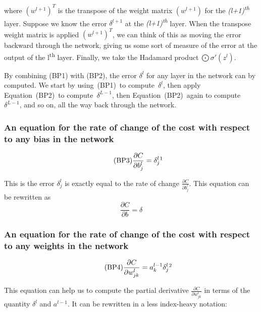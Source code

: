 \documentclass[]{article}
\begin{document}
\begin{multicols}{2}
where \(\left( w^{l + 1} \right)^{T}\) is the transpose of the weight
matrix \(\left( w^{l + 1} \right)\) for the
\emph{(l+1)\textsuperscript{th}} layer. Suppose we know the error
\(\delta^{l + 1}\) at the \emph{(l+1)\textsuperscript{th }}layer. When
the transpose weight matrix is applied \(\left( w^{l + 1} \right)^{T}\),
we can think of this as moving the error backward through the network,
giving us some sort of measure of the error at the output of the
l\textsuperscript{th} layer. Finally, we take the Hadamard
product\(\ \bigodot\sigma'(z^{l})\).

By combining (BP1) with (BP2), the error \(\delta^{l}\) for any
layer in the network can by computed. We start by using~(BP1)~to
compute~\(\delta^{l}\), then apply Equation~(BP2)~to
compute~\(\delta^{L - 1}\), then Equation~(BP2)~again to
compute~\(\delta^{L - 1}\), and so on, all the way back through the
network.

\subsubsection{An equation for the rate of change of the cost with respect to any bias in the network} 
\begin{equation} \tag{BP3}
	\frac{\partial C}{\partial b^l_{j}} = \delta^l_{j}\footnote{The equation was 
		reference from Michael A. Neilson "Neural Networks and Deep Learning",
		Determination Press, 2015~}
\end{equation}

This is the error \(\delta^l_{j}\) is exactly equal to the rate of change \(\frac{\partial C}{\partial b^l_{j}}\). This equation can be rewritten as 
\[\frac{\partial C}{\partial b} = \delta\]

\subsubsection{An equation for the rate of change of the cost with respect to any weights in the network}

\begin{equation} \tag{BP4}
	\frac{\partial C}{\partial w^l_{jk}} = a^{l-1}_{k} \delta^l_{j}\footnote{The equation was
		referenced from Michael A. Neilson "Neural Networks and Deep Learning",
		Determination Press, 2015~}
\end{equation}

This equation can help us to compute the partial derivative \(\frac{\partial C}{\partial w^l_{jk}}\) in terms of the quantity \(\delta^l\) and \(a^{l-1}\). It can be rewritten in a less index-heavy notation:


\end{multicols}
\end{document}
